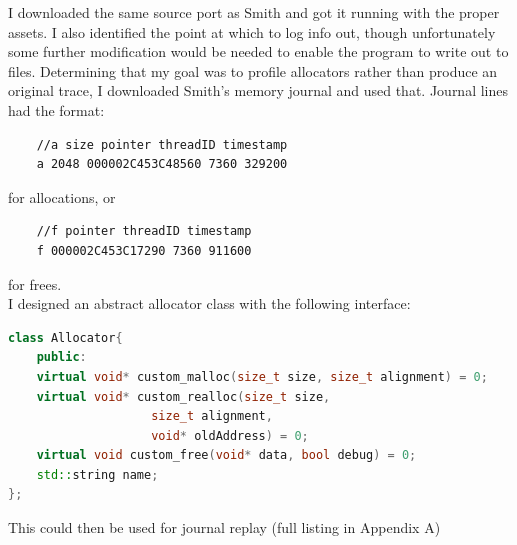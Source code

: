 \documentclass{article}
\begin{document}
I downloaded the same source port as Smith and got it running with the proper assets. I also identified the point at which to log info out, though unfortunately some further modification would be needed to enable the program to write out to files. Determining that my goal was to profile allocators rather than produce an original trace, I downloaded Smith's memory journal and used that. Journal lines had the format: \\
\begin{lstlisting}
	//a size pointer threadID timestamp
	a 2048 000002C453C48560 7360 329200
\end{lstlisting}
for allocations, or\\
\begin{lstlisting}
	//f pointer threadID timestamp
	f 000002C453C17290 7360 911600
\end{lstlisting}
for frees.
\\
I designed an abstract allocator class with the following interface:\\
\begin{lstlisting}[language=C++]
class Allocator{
	public:
	virtual void* custom_malloc(size_t size, size_t alignment) = 0;
	virtual void* custom_realloc(size_t size, 
					size_t alignment,  
					void* oldAddress) = 0;
	virtual void custom_free(void* data, bool debug) = 0;
	std::string name;
};
\end{lstlisting}
This could then be used for journal replay (full listing in Appendix A)
\end{document}
